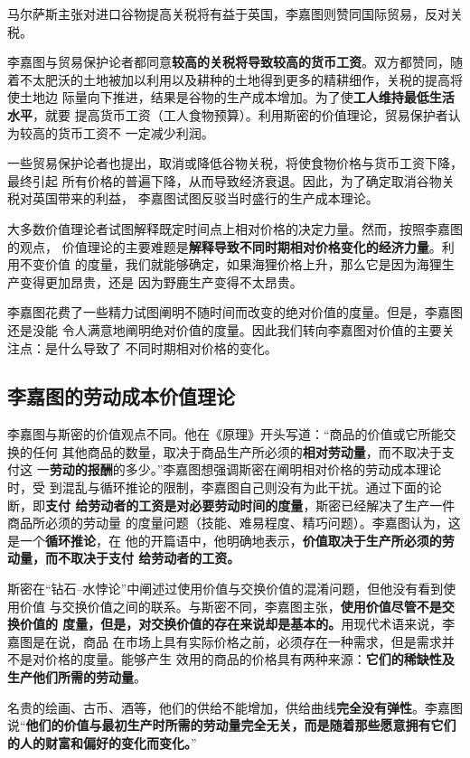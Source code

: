 马尔萨斯主张对进口谷物提高关税将有益于英国，李嘉图则赞同国际贸易，反对关税。

李嘉图与贸易保护论者都同意\textbf{较高的关税将导致较高的货币工资}。双方都赞同，随
着不太肥沃的土地被加以利用以及耕种的土地得到更多的精耕细作，关税的提高将使土地边
际量向下推进，结果是谷物的生产成本增加。为了使\textbf{工人维持最低生活水平}，就要
提高货币工资（工人食物预算）。利用斯密的价值理论，贸易保护者认为较高的货币工资不
一定减少利润。

一些贸易保护论者也提出，取消或降低谷物关税，将使食物价格与货币工资下降，最终引起
所有价格的普遍下降，从而导致经济衰退。因此，为了确定取消谷物关税对英国带来的利益，
李嘉图试图反驳当时盛行的生产成本理论。

大多数价值理论者试图解释既定时间点上相对价格的决定力量。然而，按照李嘉图的观点，
价值理论的主要难题是\textbf{解释导致不同时期相对价格变化的经济力量}。利用不变价值
的度量，我们就能够确定，如果海狸价格上升，那么它是因为海狸生产变得更加昂贵，还是
因为野鹿生产变得不太昂贵。

李嘉图花费了一些精力试图阐明不随时间而改变的绝对价值的度量。但是，李嘉图还是没能
令人满意地阐明绝对价值的度量。因此我们转向李嘉图对价值的主要关注点：是什么导致了
不同时期相对价格的变化。

\subsection{李嘉图的劳动成本价值理论}

李嘉图与斯密的价值观点不同。他在《原理》开头写道：“商品的价值或它所能交换的任何
其他商品的数量，取决于商品生产所必须的\textbf{相对劳动量}，而不取决于支付这
一\textbf{劳动的报酬}的多少。”李嘉图想强调斯密在阐明相对价格的劳动成本理论时，受
到混乱与循环推论的限制，李嘉图自己则没有为此干扰。通过下面的论断，即\textbf{支付
  给劳动者的工资是对必要劳动时间的度量}，斯密已经解决了生产一件商品所必须的劳动量
的度量问题（技能、难易程度、精巧问题）。李嘉图认为，这是一个\textbf{循环推论}，在
他的开篇语中，他明确地表示，\textbf{价值取决于生产所必须的劳动量，而不取决于支付
  给劳动者的工资。}

斯密在“钻石--水悖论”中阐述过使用价值与交换价值的混淆问题，但他没有看到使用价值
与交换价值之间的联系。与斯密不同，李嘉图主张，\textbf{使用价值尽管不是交换价值的
  度量，但是，对交换价值的存在来说却是基本的。}用现代术语来说，李嘉图是在说，商品
在市场上具有实际价格之前，必须存在一种需求，但是需求并不是对价格的度量。能够产生
效用的商品的价格具有两种来源：\textbf{它们的稀缺性及生产他们所需的劳动量}。

名贵的绘画、古币、酒等，他们的供给不能增加，供给曲线\textbf{完全没有弹性}。李嘉图
说“\textbf{他们的价值与最初生产时所需的劳动量完全无关，而是随着那些愿意拥有它们
  的人的财富和偏好的变化而变化。}”

